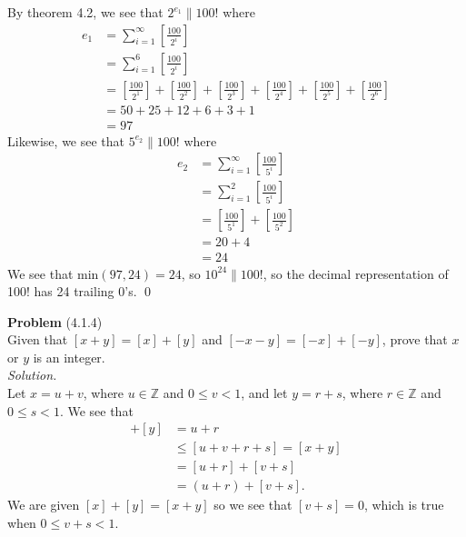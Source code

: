 \documentclass[12 pt]{amsart}
\begin{document}
  By theorem 4.2, we see that $2^{e_1} \parallel 100!$ where
  \begin{align*}
    e_1 &= \sum_{i = 1}^{\infty} \left[ \frac{100}{2^i} \right] \\
      &= \sum_{i = 1}^{6} \left[ \frac{100}{2^i} \right] \\
      &= \left[ \frac{100}{2^1} \right]
         + \left[ \frac{100}{2^2} \right]
         + \left[ \frac{100}{2^3} \right]
         + \left[ \frac{100}{2^4} \right]
         + \left[ \frac{100}{2^5} \right]
         + \left[ \frac{100}{2^6} \right] \\
      &= 50 
         + 25
         + 12
         + 6
         + 3
         + 1 \\
      &= 97
  \end{align*}
  Likewise, we see that 
  $5^{e_2} \parallel 100!$ where
  \begin{align*}
    e_2 &= \sum_{i = 1}^{\infty} \left[ \frac{100}{5^i} \right] \\
      &= \sum_{i = 1}^{2} \left[ \frac{100}{5^i} \right] \\
      &= \left[ \frac{100}{5^1} \right]
         + \left[ \frac{100}{5^2} \right] \\
      &= 20
         + 4 \\
      &= 24
  \end{align*}
  We see that $\text{min}(97, 24) = 24$, so 
  $10^{24} \parallel 100!$, so the decimal representation of 
  100! has 24 trailing 0's. 
  \qed
\vfill
\newpage



\phantom{\quad} \vfill
\noindent
\textbf{Problem} (4.1.4) \\[4ex]
  Given that $[x + y] = [x] + [y]$ and 
  $[-x - y] = [-x] + [-y]$, prove that $x$ or $y$ is an integer.
  \\[2ex]
\emph{Solution.} \\[2ex]
  Let $x = u + v$, where $u \in \mathbb{Z}$ and $0 \leq v < 1$,
  and let $y = r + s$, where $r \in \mathbb{Z}$ and $0 \leq s < 1$.
  We see that 
  \begin{align*}
    [x] + [y] &= u + r  \\
              &\leq [u + v + r + s] = [x + y] \\
              &= [u + r] + [v + s] \\
              &= (u + r) + [v + s].
  \end{align*}
  We are given $[x] + [y] = [x+y]$ so we see that $[v+s] = 0$, which
  is true when $0 \leq v + s < 1$.
\end{document}
